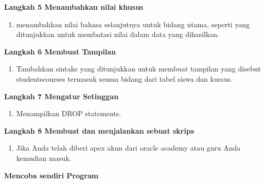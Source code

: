 \documentclass[12pt, times new roman, a4paper]{article}
\begin{document}
\textbf{Langkah 5 Menambahkan nilai khusus}
\begin{enumerate}
    \item menambahkan nilai bahasa selanjutnya untuk bidang utama, seperti yang ditunjukkan untuk membatasi nilai dalam data yang dihasilkan.
\end{enumerate}
\textbf{Langkah 6 Membuat Tampilan}
\begin{enumerate}
    \item Tambahkan sintaks yang ditunjukkan untuk membuat tampilan yang disebut students\textunderscore courses termasuk semua bidang dari tabel siswa dan kursus.
\end{enumerate}
\textbf{Langkah 7 Mengatur Setinggan}
\begin{enumerate}
    \item Menampilkan DROP statements.
\end{enumerate}
\textbf{Langkah 8 Membuat dan menjalankan sebuat skrips}
\begin{enumerate}
    \item Jika Anda telah diberi apex akun dari oracle academy atau guru Anda kemudian masuk.
\end{enumerate}
\textbf{Mencoba sendiri Program}
\end{document}
